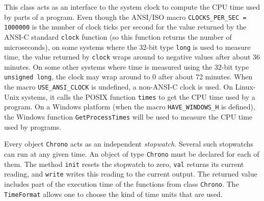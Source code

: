 % 
% 
% 
% 


This class acts as an interface to the system clock to compute the
CPU time used by parts of a program.
  Even though the ANSI/ISO macro \texttt{CLOCKS\_PER\_SEC = 1000000} 
  is the number of clock ticks per second for the value
  returned by the ANSI-C standard \texttt{clock} function 
  (so this function returns the
  number of microseconds), on some systems where the 32-bit type \texttt{long} 
  is used to measure time, the value returned by \texttt{clock}
  wraps around to negative values after about 36 minutes.
  On some other systems where time is measured using the 32-bit type
  \texttt{unsigned long}, the clock may wrap around to 0 after about
   72 minutes.
  When the macro \texttt{USE\_ANSI\_CLOCK} is undefined, 
  a non-ANSI-C clock is used. 
  On Linux-Unix systems, it calls the POSIX
  function \texttt{times} to get the CPU time used by a program.
  On a Windows platform (when the macro \texttt{HAVE\_WINDOWS\_H} is defined),
  the Windows function \texttt{GetProcessTimes} will be used to measure
  the CPU time used by programs.


Every object \texttt{Chrono} acts as an independent 
\emph{stopwatch}.  Several such stopwatchs can run at any given time.
An object of type \texttt{Chrono} must be declared 
for each of them.
The method \texttt{init} resets the stopwatch to zero,
\texttt{val} returns its current reading,
and \texttt{write} writes this reading to the current output.
The returned value includes part of the execution time of the functions
from class \texttt{Chrono}.
The \texttt{TimeFormat} allows one to choose the kind of 
time units that are used.  

